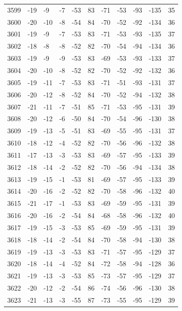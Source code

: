 \begin{table}[H]
\begin{tabular}{lllllllllll}
3599 & -19 & -9 & -7 & -53 & 83 & -71 & -53 & -93 & -135 & 35 \\
3600 & -20 & -10 & -8 & -54 & 84 & -70 & -52 & -92 & -134 & 36 \\
3601 & -19 & -9 & -7 & -53 & 83 & -71 & -53 & -93 & -135 & 37 \\
3602 & -18 & -8 & -8 & -52 & 82 & -70 & -54 & -94 & -134 & 36 \\
3603 & -19 & -9 & -9 & -53 & 83 & -69 & -53 & -93 & -133 & 37 \\
3604 & -20 & -10 & -8 & -52 & 82 & -70 & -52 & -92 & -132 & 36 \\
3605 & -19 & -11 & -7 & -53 & 83 & -71 & -51 & -93 & -131 & 37 \\
3606 & -20 & -12 & -8 & -52 & 84 & -70 & -52 & -94 & -132 & 38 \\
3607 & -21 & -11 & -7 & -51 & 85 & -71 & -53 & -95 & -131 & 39 \\
3608 & -20 & -12 & -6 & -50 & 84 & -70 & -54 & -96 & -130 & 38 \\
3609 & -19 & -13 & -5 & -51 & 83 & -69 & -55 & -95 & -131 & 37 \\
3610 & -18 & -12 & -4 & -52 & 82 & -70 & -56 & -96 & -132 & 38 \\
3611 & -17 & -13 & -3 & -53 & 83 & -69 & -57 & -95 & -133 & 39 \\
3612 & -18 & -14 & -2 & -52 & 82 & -70 & -56 & -94 & -134 & 38 \\
3613 & -19 & -15 & -1 & -53 & 81 & -69 & -57 & -95 & -133 & 39 \\
3614 & -20 & -16 & -2 & -52 & 82 & -70 & -58 & -96 & -132 & 40 \\
3615 & -21 & -17 & -1 & -53 & 83 & -69 & -59 & -95 & -131 & 39 \\
3616 & -20 & -16 & -2 & -54 & 84 & -68 & -58 & -96 & -132 & 40 \\
3617 & -19 & -15 & -3 & -53 & 85 & -69 & -59 & -95 & -131 & 39 \\
3618 & -18 & -14 & -2 & -54 & 84 & -70 & -58 & -94 & -130 & 38 \\
3619 & -19 & -13 & -3 & -53 & 83 & -71 & -57 & -95 & -129 & 37 \\
3620 & -18 & -14 & -4 & -52 & 84 & -72 & -58 & -94 & -128 & 36 \\
3621 & -19 & -13 & -3 & -53 & 85 & -73 & -57 & -95 & -129 & 37 \\
3622 & -20 & -12 & -2 & -54 & 86 & -74 & -56 & -96 & -130 & 38 \\
3623 & -21 & -13 & -3 & -55 & 87 & -73 & -55 & -95 & -129 & 39 \\

\end{tabular}
\end{table}
